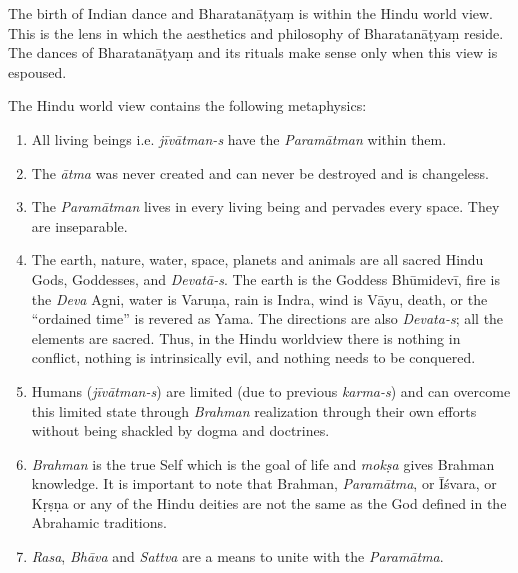 The birth of Indian dance and Bharatanāṭyaṃ is within the Hindu world view. This is the lens in which the aesthetics and philosophy of Bharatanāṭyaṃ reside. The dances of Bharatanāṭyaṃ and its rituals make sense only when this view is espoused.

The Hindu world view contains the following metaphysics:

\begin{enumerate}[{\rm 1)}]
\itemsep=0pt
\item All living beings i.e. \textit{jīvātman-s} have the \textit{Paramātman} within them. 

 \item The \textit{ātma} was never created and can never be destroyed and is changeless.

 \item The \textit{Paramātman} lives in every living being and pervades every space. They are inseparable. 

 \item The earth, nature, water, space, planets and animals are all sacred Hindu Gods, Goddesses, and \textit{Devatā-s}. The earth is the Goddess Bhūmidevī, fire is the \textit{Deva }Agni, water is Varuṇa, rain is Indra, wind is Vāyu, death, or the “ordained time” is revered as Yama. The directions are also \textit{Devata-s}; all the elements are sacred. Thus, in the Hindu worldview there is nothing in conflict, nothing is intrinsically evil, and nothing needs to be conquered. 

 \item Humans (\textit{jīvātman-s}) are limited (due to previous \textit{karma-s}) and can overcome this limited state through \textit{Brahman} realization through their own efforts without being shackled by dogma and doctrines.

 \item \textit{Brahman} is the true Self which is the goal of life and \textit{mokṣa} gives Brahman knowledge. It is important to note that Brahman, \textit{Paramātma}, or Īśvara, or Kṛṣṇa or any of the Hindu deities are not the same as the God defined in the Abrahamic traditions.

 \item \textit{Rasa}, \textit{Bhāva }and \textit{Sattva} are a means to unite with the \textit{Paramātma}.

\end{enumerate}

